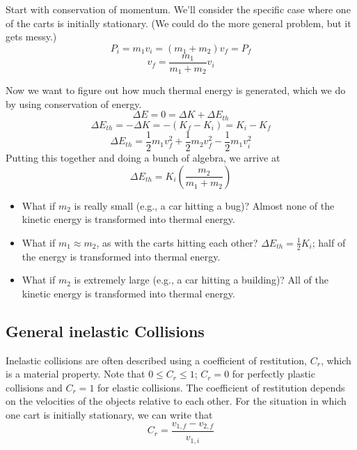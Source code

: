 Start with conservation of momentum. We'll consider the specific case where one of the carts is initially stationary. (We could do the more general problem, but it gets messy.)
$$P_i=m_1v_i=(m_1+m_2)v_f=P_f$$
$$\boxed{v_f=\frac{m_1}{m_1+m_2}v_i}$$

Now we want to figure out how much thermal energy is generated, which we do by using conservation of energy.
$$\Delta{E}=0=\Delta{K}+\Delta{E_{th}}$$
$$\Delta{E_{th}}=-\Delta{K}=-(K_f-K_i)=K_i-K_f$$
$$\Delta E_{th} = \frac{1}{2}m_1v_f^2+\frac{1}{2}m_2v_f^2-\frac{1}{2}m_1v_i^2$$
Putting this together and doing a bunch of algebra, we arrive at
$$\boxed{\Delta E_{th} = K_i\left(\frac{m_2}{m_1+m_2}\right)}$$


\begin{itemize}
\item What if $m_2$ is really small (e.g., a car hitting a bug)? Almost none of the kinetic energy is transformed into thermal energy.
\item What if $m_1\approx m_2$, as with the carts hitting each other? $\Delta E_{th}=\frac{1}{2}K_i$; half of the energy is transformed into thermal energy.
\item What if $m_2$ is extremely large (e.g., a car hitting a building)? All of the kinetic energy is transformed into thermal energy.
\end{itemize}


\subsection{General inelastic Collisions}
Inelastic collisions are often described using a coefficient of restitution, $C_r$, which is a material property. Note that $0\leq C_r\leq 1$; $C_r=0$ for perfectly plastic collisions and $C_r=1$ for elastic collisions. The coefficient of restitution depends on the velocities of the objects relative to each other. For the situation in which one cart is initially stationary, we can write that
$$C_r = \frac{v_{1,f}-v_{2,f}}{v_{1,i}}$$

